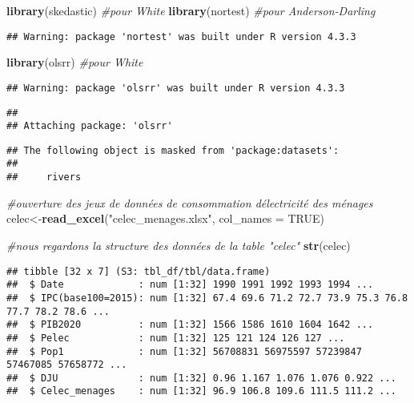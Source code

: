 \documentclass[
]{article}
\newenvironment{Shaded}{\begin{snugshade}}{\end{snugshade}}
\newcommand{\AttributeTok}[1]{\textcolor[rgb]{0.13,0.29,0.53}{#1}}
\newcommand{\CommentTok}[1]{\textcolor[rgb]{0.56,0.35,0.01}{\textit{#1}}}
\newcommand{\ConstantTok}[1]{\textcolor[rgb]{0.56,0.35,0.01}{#1}}
\newcommand{\FunctionTok}[1]{\textcolor[rgb]{0.13,0.29,0.53}{\textbf{#1}}}
\newcommand{\NormalTok}[1]{#1}
\newcommand{\OtherTok}[1]{\textcolor[rgb]{0.56,0.35,0.01}{#1}}
\newcommand{\StringTok}[1]{\textcolor[rgb]{0.31,0.60,0.02}{#1}}
\begin{document}
\begin{Shaded}
\begin{Highlighting}[]
\FunctionTok{library}\NormalTok{(skedastic) }\CommentTok{\#pour White}
\FunctionTok{library}\NormalTok{(nortest) }\CommentTok{\#pour Anderson{-}Darling}
\end{Highlighting}
\end{Shaded}

\begin{verbatim}
## Warning: package 'nortest' was built under R version 4.3.3
\end{verbatim}

\begin{Shaded}
\begin{Highlighting}[]
\FunctionTok{library}\NormalTok{(olsrr) }\CommentTok{\#pour White}
\end{Highlighting}
\end{Shaded}

\begin{verbatim}
## Warning: package 'olsrr' was built under R version 4.3.3
\end{verbatim}

\begin{verbatim}
## 
## Attaching package: 'olsrr'
\end{verbatim}

\begin{verbatim}
## The following object is masked from 'package:datasets':
## 
##     rivers
\end{verbatim}

\begin{Shaded}
\begin{Highlighting}[]
\CommentTok{\#ouverture des jeux de données de consommation d\textquotesingle{}électricité des ménages}
\NormalTok{celec}\OtherTok{\textless{}{-}}\FunctionTok{read\_excel}\NormalTok{(}\StringTok{"celec\_menages.xlsx"}\NormalTok{, }\AttributeTok{col\_names =} \ConstantTok{TRUE}\NormalTok{)}
\end{Highlighting}
\end{Shaded}

\begin{Shaded}
\begin{Highlighting}[]
\CommentTok{\#nous regardons la structure des données de la table "celec"}
\FunctionTok{str}\NormalTok{(celec)}
\end{Highlighting}
\end{Shaded}

\begin{verbatim}
## tibble [32 x 7] (S3: tbl_df/tbl/data.frame)
##  $ Date             : num [1:32] 1990 1991 1992 1993 1994 ...
##  $ IPC(base100=2015): num [1:32] 67.4 69.6 71.2 72.7 73.9 75.3 76.8 77.7 78.2 78.6 ...
##  $ PIB2020          : num [1:32] 1566 1586 1610 1604 1642 ...
##  $ Pelec            : num [1:32] 125 121 124 126 127 ...
##  $ Pop1             : num [1:32] 56708831 56975597 57239847 57467085 57658772 ...
##  $ DJU              : num [1:32] 0.96 1.167 1.076 1.076 0.922 ...
##  $ Celec_menages    : num [1:32] 96.9 106.8 109.6 111.5 111.2 ...
\end{verbatim}
\end{document}
